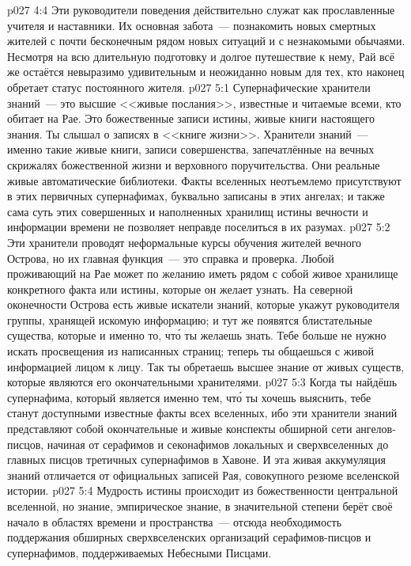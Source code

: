\vs p027 4:4 Эти руководители поведения действительно служат как прославленные учителя и наставники. Их основная забота~--- познакомить новых смертных жителей с почти бесконечным рядом новых ситуаций и с незнакомыми обычаями. Несмотря на всю длительную подготовку и долгое путешествие к нему, Рай всё же остаётся невыразимо удивительным и неожиданно новым для тех, кто наконец обретает статус постоянного жителя.
\vs p027 5:1 Супернафические хранители знаний~--- это высшие <<живые послания>>, известные и читаемые всеми, кто обитает на Рае. Это божественные записи истины, живые книги настоящего знания. Ты слышал о записях в <<книге жизни>>. Хранители знаний~--- именно такие живые книги, записи совершенства, запечатлённые на вечных скрижалях божественной жизни и верховного поручительства. Они реальные живые автоматические библиотеки. Факты вселенных неотъемлемо присутствуют в этих первичных супернафимах, буквально записаны в этих ангелах; и также сама суть этих совершенных и наполненных хранилищ истины вечности и информации времени не позволяет неправде поселиться в их разумах.
\vs p027 5:2 Эти хранители проводят неформальные курсы обучения жителей вечного Острова, но их главная функция~--- это справка и проверка. Любой проживающий на Рае может по желанию иметь рядом с собой живое хранилище конкретного факта или истины, которые он желает узнать. На северной оконечности Острова есть живые искатели знаний, которые укажут руководителя группы, хранящей искомую информацию; и тут же появятся блистательные существа, которые и  именно то, чт\'о ты желаешь знать. Тебе больше не нужно искать просвещения из написанных страниц; теперь ты общаешься с живой информацией лицом к лицу. Так ты обретаешь высшее знание от живых существ, которые являются его окончательными хранителями.
\vs p027 5:3 Когда ты найдёшь супернафима, который является именно тем, чт\'о ты хочешь выяснить, тебе станут доступными  известные факты всех вселенных, ибо эти хранители знаний представляют собой окончательные и живые конспекты обширной сети ангелов\hyp{}писцов, начиная от серафимов и секонафимов локальных и сверхвселенных до главных писцов третичных супернафимов в Хавоне. И эта живая аккумуляция знаний отличается от официальных записей Рая, совокупного резюме вселенской истории.
\vs p027 5:4 Мудрость истины происходит из божественности центральной вселенной, но знание, эмпирическое знание, в значительной степени берёт своё начало в областях времени и пространства~--- отсюда необходимость поддержания обширных сверхвселенских организаций серафимов\hyp{}писцов и супернафимов, поддерживаемых Небесными Писцами.
